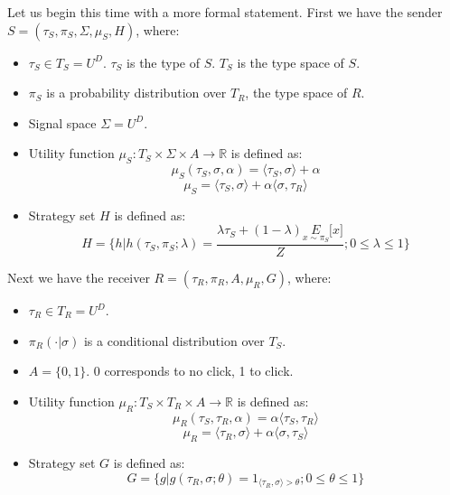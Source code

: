 \documentclass{article}
\begin{document}
Let us begin this time with a more formal statement. First we have the sender $S = (\tau_S, \pi_S, \Sigma, \mu_S, H)$, where:
\begin{itemize}
	\item $\tau_S \in T_S = U^D$. $\tau_S$ is the type of $S$. $T_S$ is the type space of $S$.
	\item $\pi_S$ is a probability distribution over $T_R$, the type space of $R$.
	\item Signal space $\Sigma = U^D$.
	\item Utility function $\mu_S: T_S \times \Sigma \times A \rightarrow \mathbb{R}$ is defined as:
	\begin{equation}
		\mu_S(\tau_S, \sigma, \alpha) = \langle \tau_S, \sigma \rangle + \alpha
	\end{equation}
	\begin{equation}
		\mu_S = \langle \tau_S, \sigma \rangle + \alpha \langle \sigma, \tau_R \rangle
	\end{equation}
	\item Strategy set $H$ is defined as:
	\begin{equation}
		H = \lbrace h | h(\tau_S, \pi_S; \lambda) = \frac{\lambda \tau_S + (1-\lambda)\underset{x\sim\pi_S}{E}\lbrack x \rbrack}{Z}; 0 \le \lambda \le 1 \rbrace
	\end{equation}
\end{itemize}

\noindent Next we have the receiver $R = (\tau_R, \pi_R, A, \mu_R, G)$, where:
\begin{itemize}
	\item $\tau_R \in T_R = U^D$.
	\item $\pi_R(\cdot|\sigma)$ is a conditional distribution over $T_S$.
	\item $A = \lbrace 0,1 \rbrace$. 0 corresponds to no click, 1 to click.
	\item Utility function $\mu_R: T_S \times T_R \times A \rightarrow \mathbb{R}$ is defined as:
	\begin{equation}
		\mu_R(\tau_S, \tau_R, \alpha) = \alpha \langle \tau_S, \tau_R \rangle
	\end{equation}
	\begin{equation}
		\mu_R = \langle \tau_R, \sigma \rangle + \alpha \langle \sigma, \tau_S \rangle
	\end{equation}
	\item Strategy set $G$ is defined as:
	\begin{equation}
		G = \lbrace g | g(\tau_R, \sigma; \theta) = 1_{\langle \tau_R, \sigma \rangle > \theta}; 0 \le \theta \le 1 \rbrace
	\end{equation}
\end{itemize}
\end{document}
